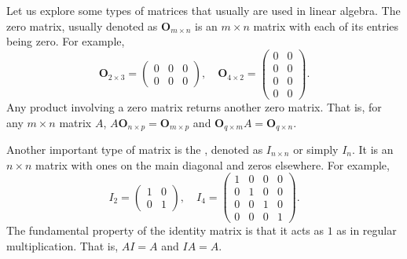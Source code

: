 \documentclass{ximera}
\begin{document}
Let us explore some types of matrices that usually are used in linear
algebra. The zero matrix, usually denoted as $\textbf{O}_{m \times n}$ is
an $m \times n$ matrix with each of its entries being zero. For example,
\[
  \textbf{O}_{2\times 3} =
  \begin{pmatrix}
    0 & 0 & 0 \\
    0 & 0 & 0
  \end{pmatrix},
  \quad
  \textbf{O}_{4\times 2} =
  \begin{pmatrix}
    0 & 0 \\
    0 & 0 \\
    0 & 0 \\
    0 & 0
  \end{pmatrix}.
\]
Any product involving a zero matrix returns another zero matrix. That
is, for any $m \times n$ matrix $A$, $A \mathbf{O}_{n \times p} = \mathbf{O}_{m
  \times p}$ and $\mathbf{O}_{q \times m} A = \mathbf{O}_{q \times n}$.


Another important type of matrix is the , denoted as
$I_{n \times n}$ or simply $I_n$. It is an $n \times n$ matrix with ones on the
main diagonal and zeros elsewhere. For example,
\[
  I_2 =
  \begin{pmatrix}
    1 & 0 \\
    0 & 1
  \end{pmatrix},
  \quad
  I_4 =
  \begin{pmatrix}
    1 & 0 & 0 & 0 \\
    0 & 1 & 0 & 0 \\
    0 & 0 & 1 & 0 \\
    0 & 0 & 0 & 1
  \end{pmatrix}.
\]
The fundamental property of the identity matrix is that it acts as $1$
as in regular multiplication. That is, $AI = A$ and $IA= A$.
\end{document}

